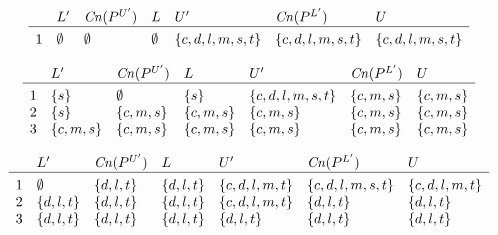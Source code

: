 \documentclass{article}
\begin{document}
\[
\begin{array}{c@{\hspace{10pt}}llllll}
& L' & \mathit{Cn}(P^{U'}) & L
& U' & \mathit{Cn}(P^{L'}) & U \\\hline\\[-3mm]
1 & \emptyset & \emptyset & \emptyset & \{c,d,l,m,s,t\} & \{c,d,l,m,s,t\} & \{c,d,l,m,s,t\} \\ 
\end{array}
\]

\[
\begin{array}{c@{\hspace{10pt}}llllll}
& L' & \mathit{Cn}(P^{U'}) & L
& U' & \mathit{Cn}(P^{L'}) & U \\\hline\\[-3mm]
1 & \{s\} & \emptyset & \{s\} & \{c,d,l,m,s,t\} & \{c,m,s\} & \{c,m,s\} \\ 
2 & \{s\} & \{c,m,s\} & \{c,m,s\} & \{c,m,s\} & \{c,m,s\} & \{c,m,s\} \\ 
3 & \{c,m,s\} & \{c,m,s\} & \{c,m,s\} & \{c,m,s\} & \{c,m,s\} & \{c,m,s\} \\ 
\end{array}
\]

\[
\begin{array}{c@{\hspace{10pt}}llllll}
& L' & \mathit{Cn}(P^{U'}) & L
& U' & \mathit{Cn}(P^{L'}) & U \\\hline\\[-3mm]
1 & \emptyset & \{d,l,t\} & \{d,l,t\} & \{c,d,l,m,t\} & \{c,d,l,m,s,t\} & \{c,d,l,m,t\} \\ 
2 & \{d,l,t\} & \{d,l,t\} & \{d,l,t\} & \{c,d,l,m,t\} & \{d,l,t\} & \{d,l,t\} \\ 
3 & \{d,l,t\} & \{d,l,t\} & \{d,l,t\} & \{d,l,t\} & \{d,l,t\} & \{d,l,t\} \\ 
\end{array}
\]
\end{document}

